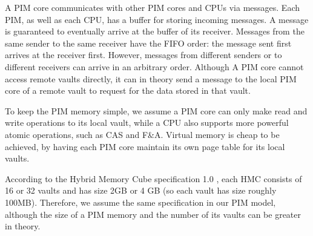 A PIM core communicates with other PIM cores and CPUs via messages.
Each PIM, as well as each CPU, has a buffer for storing incoming messages.
A message is guaranteed to eventually arrive at the buffer of its receiver.
Messages from the same sender to the same receiver have the FIFO order: 
the message sent first arrives at the receiver first. 
However, messages from different senders or to different receivers can arrive in an arbitrary order. 
Although A PIM core cannot access remote vaults directly, it can in theory send a message
to the local PIM core of a remote vault to request for the data stored in that vault.

To keep the PIM memory simple, 
we assume a PIM core can only make read and write operations to its local vault,
while a CPU also supports more powerful atomic operations, such as CAS and F\&A.
Virtual memory is cheap to be achieved, by having each PIM core maintain 
its own page table for its local vaults.

According to the Hybrid Memory Cube specification 1.0 \cite{website:HMC}, each HMC consists of 16 or 
32 vaults and has size 2GB or 4 GB (so each vault has size roughly 100MB). 
Therefore, we assume the same specification in our PIM model, although the size of a PIM memory and 
the number of its vaults can be greater in theory. 
